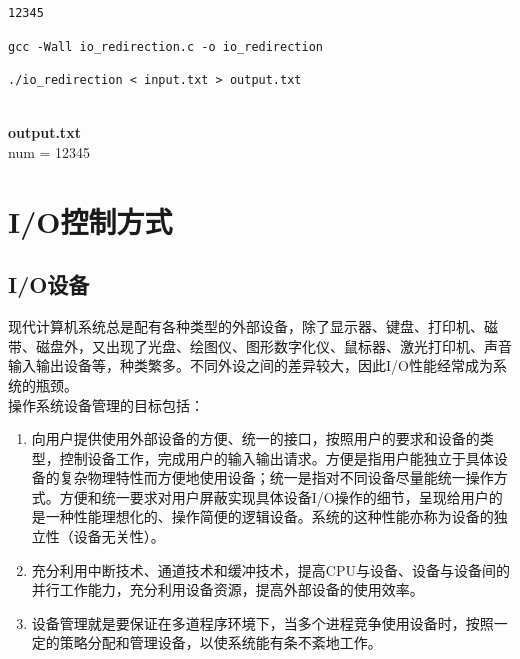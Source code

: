 \begin{lstlisting}[title=input.txt]
12345
\end{lstlisting}

\begin{lstlisting}[title=编译]
gcc -Wall io_redirection.c -o io_redirection
\end{lstlisting}

\begin{lstlisting}[title=运行]
./io_redirection < input.txt > output.txt
\end{lstlisting}

\begin{tcolorbox}
	 \\
	\textbf{output.txt} \\
	num = 12345
\end{tcolorbox}

\newpage

\section{I/O控制方式}

\subsection{I/O设备}

现代计算机系统总是配有各种类型的外部设备，除了显示器、键盘、打印机、磁带、磁盘外，又出现了光盘、绘图仪、图形数字化仪、鼠标器、激光打印机、声音输入输出设备等，种类繁多。不同外设之间的差异较大，因此I/O性能经常成为系统的瓶颈。 \\

操作系统设备管理的目标包括：

\begin{enumerate}
	\item 向用户提供使用外部设备的方便、统一的接口，按照用户的要求和设备的类型，控制设备工作，完成用户的输入输出请求。方便是指用户能独立于具体设备的复杂物理特性而方便地使用设备；统一是指对不同设备尽量能统一操作方式。方便和统一要求对用户屏蔽实现具体设备I/O操作的细节，呈现给用户的是一种性能理想化的、操作简便的逻辑设备。系统的这种性能亦称为设备的独立性（设备无关性）。

	\item 充分利用中断技术、通道技术和缓冲技术，提高CPU与设备、设备与设备间的并行工作能力，充分利用设备资源，提高外部设备的使用效率。

	\item 设备管理就是要保证在多道程序环境下，当多个进程竞争使用设备时，按照一定的策略分配和管理设备，以使系统能有条不紊地工作。
\end{enumerate}

